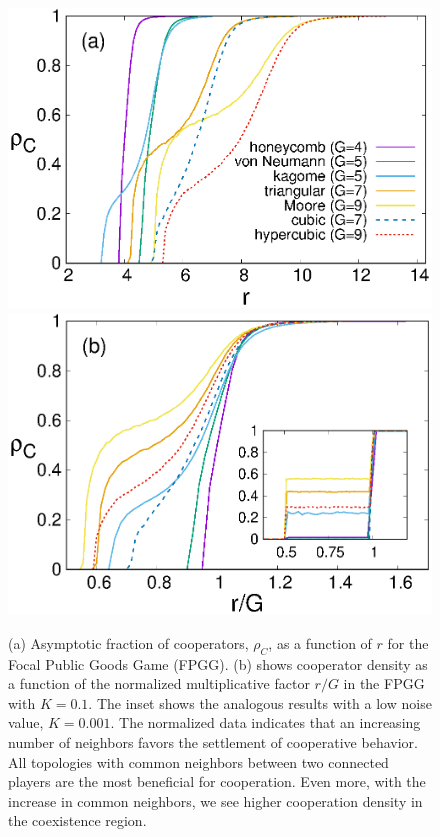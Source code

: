 \documentclass[5p,review]{elsarticle}
\begin{document}
\begin{figure}[!t]
\centering
{\includegraphics[width=\linewidth]{coopK.eps}}
\includegraphics[width=\linewidth]{coopG.eps}


\caption{ (a) Asymptotic fraction of cooperators, $\rho_C$, as a function of $r$ for the Focal Public Goods Game (FPGG). (b) shows cooperator density as a function of the normalized multiplicative factor $r/G$ in the FPGG with $K=0.1$. The inset shows the analogous results with a low noise value, $K=0.001$. The normalized data indicates that an increasing number of neighbors favors the settlement of cooperative behavior. All topologies with common neighbors between two connected players are the most beneficial for cooperation. Even more, with the increase in common neighbors, we see higher cooperation density in the coexistence region. }
\label{norm}
\end{figure}
\end{document}
